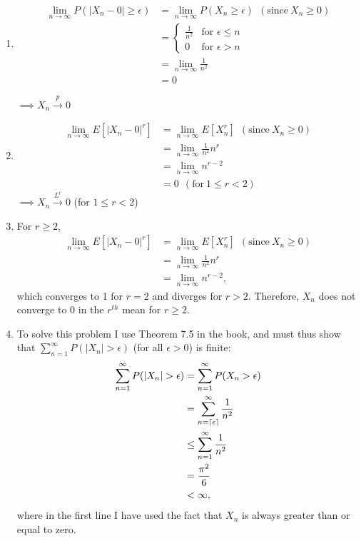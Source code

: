 \begin{problem}{10} $ $
\begin{enumerate}

\item 

\begin{align*}
\lim_{n \rightarrow \infty}P(|X_n-0|\ge \epsilon) &= \lim_{n \rightarrow \infty}P(X_n\ge \epsilon) ~~(\mathrm{since}~X_n\ge 0) \\
& = \begin{cases}
                                   \frac{1}{n^2} & \text{for $\epsilon \le n$} \\
                                    0 & \text{for $\epsilon >n$}
       \end{cases}\\
& = \lim_{n \rightarrow \infty} \frac{1}{n^2} \\
& = 0
\end{align*}

$\implies X_n \xrightarrow{p} 0$

\item 

\begin{align*}
\lim_{n \rightarrow \infty}E[|X_n-0|^r] &= \lim_{n \rightarrow \infty}E[X_n^r] ~~(\mathrm{since}~X_n\ge 0) \\
& = \lim_{n \rightarrow \infty} \frac{1}{n^2}n^r \\
& = \lim_{n \rightarrow \infty} n^{r-2} \\
& = 0 ~~(\mathrm{for}~1\le r<2) 
\end{align*}
$\implies X_n \xrightarrow{L^r} 0$ (for $1\le r<2$)

\item 
For $r \ge 2$,
\begin{align*}
\lim_{n \rightarrow \infty}E[|X_n-0|^r] &= \lim_{n \rightarrow \infty}E[X_n^r] ~~(\mathrm{since}~X_n\ge 0) \\
& = \lim_{n \rightarrow \infty} \frac{1}{n^2}n^r \\
& = \lim_{n \rightarrow \infty} n^{r-2},
\end{align*}
which converges to 1 for $r=2$ and diverges for $r>2$.  Therefore, $X_n$ does not converge to 0 in the $r^{th}$ mean for $r \ge 2$.

\item  To solve this problem I use Theorem 7.5 in the book, and must thus show that $\sum_{n=1}^\infty P(|X_n| > \epsilon)$ (for all $\epsilon>0$) is finite:
\begin{align*}
\sum_{n=1}^\infty P(|X_n|> \epsilon)& =\sum_{n=1}^\infty P(X_n> \epsilon) \\
& = \sum_{n=\ceil{\epsilon}}^\infty \frac{1}{n^2} \\
&\le \sum_{n=1}^\infty \frac{1}{n^2} \\
& = \frac{\pi^2}{6} \\
& < \infty,
\end{align*}
where in the first line I have used the fact that $X_n$ is always greater than or equal to zero.

\end{enumerate}
\end{problem}


